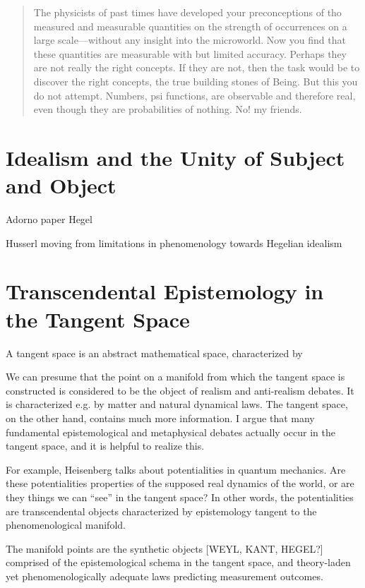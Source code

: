 \begin{quote}
    The physicists of past times have developed your preconceptions of tho measured and measurable quantities on the strength of occurrences on a large scale---without any insight into the microworld. Now you find that these quantities are measurable with but limited accuracy. Perhaps they are not really the right concepts. If they are not, then the task would be to discover the right concepts, the true building stones of Being. But this you do not attempt. Numbers, psi functions, are observable and therefore real, even though they are probabilities of nothing. No! my friends.

    \citep[p. 31-32]{Riezler1940}
\end{quote}

\section{Idealism and the Unity of Subject and Object}


Adorno paper
Hegel

Husserl moving from limitations in phenomenology towards Hegelian idealism



\section{Transcendental Epistemology in the Tangent Space}

A tangent space is an abstract mathematical space, characterized by 

We can presume that the point on a manifold from which the tangent space is constructed is considered to be the object of realism and anti-realism debates.  It is characterized e.g. by matter and natural dynamical laws.  The tangent space, on the other hand, contains much more information.  I argue that many fundamental epistemological and metaphysical debates actually occur in the tangent space, and it is helpful to realize this.

For example, Heisenberg talks about potentialities in quantum mechanics.  Are these potentialities properties of the supposed real dynamics of the world, or are they things we can ``see'' in the tangent space?  In other words, the potentialities are transcendental objects characterized by epistemology tangent to the phenomenological manifold.

The manifold points are the synthetic objects [WEYL, KANT, HEGEL?] comprised of the epistemological schema in the tangent space, and theory-laden yet phenomenologically adequate laws predicting measurement outcomes.  

